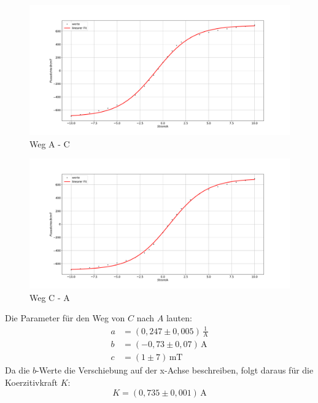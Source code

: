 \begin{figure}
\centering
\includegraphics[width=\textwidth]{plotkoertiv.pdf}
\caption{Weg A - C}
\label{fig:koe}
\end{figure}

\begin{figure}
\centering
\includegraphics[width=\textwidth]{plotkoertiv2.pdf}
\caption{Weg C - A}
\label{fig:koe2}
\end{figure}
Die Parameter für den Weg von $C$ nach $A$ lauten:
 \begin{align*}
   a &= (0,247 \pm 0,005) \, \mathrm{\frac{1}{A}}\\
   b &= (-0,73 \pm 0,07)\, \mathrm{A} \\
   c &= (1 \pm 7) \, \mathrm{mT}\,
 \end{align*}
 Da die $b$-Werte die Verschiebung auf der x-Achse beschreiben, folgt daraus für die Koerzitivkraft $K$:
 \begin{equation*}
   K = (0,735 \pm  0,001) \, \mathrm{A}
\end{equation*}
